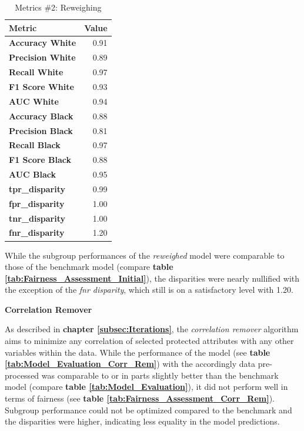 \begin{table}[!htbp]
    \centering
    \begin{tabular}{lr}
    \toprule
    \textbf{Metric} & \textbf{Value} \\
    \midrule
    \textbf{Accuracy White} & 0.91 \\
    \textbf{Precision White} & 0.89 \\
    \textbf{Recall White} & 0.97 \\
    \textbf{F1 Score White} & 0.93 \\
    \textbf{AUC White} & 0.94 \\
    \midrule
    \textbf{Accuracy Black} & 0.88 \\
    \textbf{Precision Black} & 0.81 \\
    \textbf{Recall Black} & 0.97 \\
    \textbf{F1 Score Black} & 0.88 \\
    \textbf{AUC Black} & 0.95 \\
    \midrule
    \textbf{tpr\_disparity} & 0.99 \\
    \textbf{fpr\_disparity} & 1.00 \\
    \textbf{tnr\_disparity} & 1.00 \\
    \textbf{fnr\_disparity} & 1.20 \\
    \bottomrule
    \end{tabular}
    \caption{Metrics \#2: Reweighing}
    \label{tab:Fairness_Assessment_Reweighing}
    \small
    While the subgroup performances of the \textit{reweighed} model were comparable to those of the benchmark model (compare \textbf{table \ref{tab:Fairness_Assessment_Initial}}), the disparities were nearly nullified with the exception of the \textit{fnr disparity}, which still is on a satisfactory level with 1.20.
\end{table}

\textbf{Correlation Remover}

As described in \textbf{chapter \ref{subsec:Iterations}}, the \textit{correlation remover} algorithm aims to minimize any correlation of selected protected attributes with any other variables within the data.
While the performance of the model (see \textbf{table \ref{tab:Model_Evaluation_Corr_Rem}}) with the accordingly data pre-processed was comparable to or in parts slightly better than the benchmark model (compare \textbf{table \ref{tab:Model_Evaluation}}), it did not perform well in terms of fairness (see \textbf{table \ref{tab:Fairness_Assessment_Corr_Rem}}).
Subgroup performance could not be optimized compared to the benchmark and the disparities were higher, indicating less equality in the model predictions.

